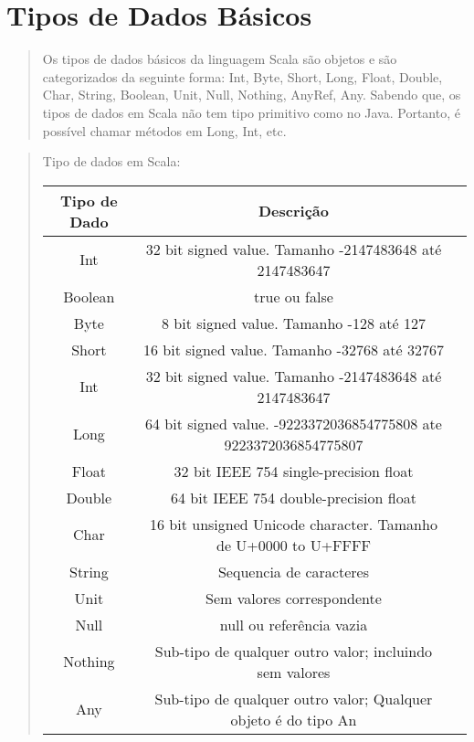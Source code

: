 \section{Tipos de Dados B\'{a}sicos}

\begin{quote}
  Os tipos de dados básicos da linguagem Scala são objetos e são categorizados da seguinte forma: Int, Byte, Short,  Long, Float, Double, Char, String, Boolean, Unit, Null, Nothing, AnyRef, Any.
  Sabendo que, os tipos de dados em Scala não tem tipo primitivo como no Java. Portanto, é possível chamar métodos em Long, Int, etc.
  \cite{Wampler2021}
\end{quote}

\begin{quote}
  \hspace{2.5mm} Tipo de dados em Scala:

  \begin{tabular}{ |c|c|c| }
    \hline
    Tipo de Dado & Descrição                                                         \\
    \hline
    Int          & 32 bit signed value. Tamanho -2147483648 até 2147483647           \\
    \hline
    Boolean      & true ou false                                                     \\
    \hline
    Byte         & 8 bit signed value. Tamanho -128 até 127                          \\
    \hline
    Short        & 16 bit signed value. Tamanho -32768 até 32767                     \\
    \hline
    Int          & 32 bit signed value. Tamanho -2147483648 até 2147483647           \\
    \hline
    Long         & 64 bit signed value. -9223372036854775808 ate 9223372036854775807 \\
    \hline
    Float        & 32 bit IEEE 754 single-precision float                            \\
    \hline
    Double       & 64 bit IEEE 754 double-precision float                            \\
    \hline
    Char         & 16 bit unsigned Unicode character. Tamanho de U+0000 to U+FFFF    \\
    \hline
    String       & Sequencia de caracteres                                           \\
    \hline
    Unit         & Sem valores correspondente                                        \\
    \hline
    Null         & null ou referência vazia                                          \\
    \hline
    Nothing      & Sub-tipo de qualquer outro valor; incluindo sem valores           \\
    \hline
    Any          & Sub-tipo de qualquer outro valor; Qualquer objeto é do tipo An    \\
    \hline
  \end{tabular}
\end{quote}

